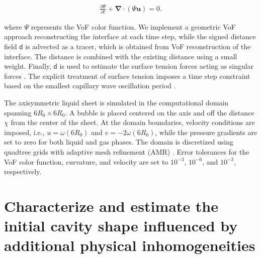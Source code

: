 \documentclass[reprint,amssymb,superscriptaddress,aps,prfluids,onecolumn]{revtex4-2}
\begin{document}
\begin{align}
	\frac{\partial \Psi }{\partial t} + \boldsymbol{\nabla\cdot}\left( \Psi \boldsymbol{u}\right) = 0. 
	\label{eq:volfracconserve}
\end{align}

\noindent where $\Psi$ represents the VoF color function. We implement a geometric VoF approach reconstructing the interface at each time step, while the signed distance field $\mathsf{d}$ is advected as a tracer, which is obtained from VoF reconstruction of the interface. The distance is combined with the existing distance using a small weight. Finally,  $\mathsf{d}$ is used to estimate the surface tension forces acting as singular forces \cite{popinet2009accurate, brackbill1992continuum}. The explicit treatment of surface tension imposes a time step constraint based on the smallest capillary wave oscillation period \citep{popinet2009accurate}. 



The axisymmetric liquid sheet is simulated in the computational domain spanning $6R_0 \times 6R_0$. A bubble is placed centered on the axis and off the distance $\chi$ from the center of the sheet. At the domain boundaries, velocity conditions are imposed, i.e., $u=\omega \left(6 R_0\right)$ and $v= - 2 \omega \left(6R_0\right)$, while the pressure gradients are set to zero for both liquid and gas phases. The domain is discretized using quadtree grids with adaptive mesh refinement (AMR) \citep{popinet2009accurate}. Error tolerances for the VoF color function, curvature, and velocity are set to $10^{-3}$, $10^{-6}$, and $10^{-3}$, respectively.

\section{Characterize and estimate the initial cavity shape influenced by additional physical inhomogeneities}\label{sec:shape}
\end{document}
